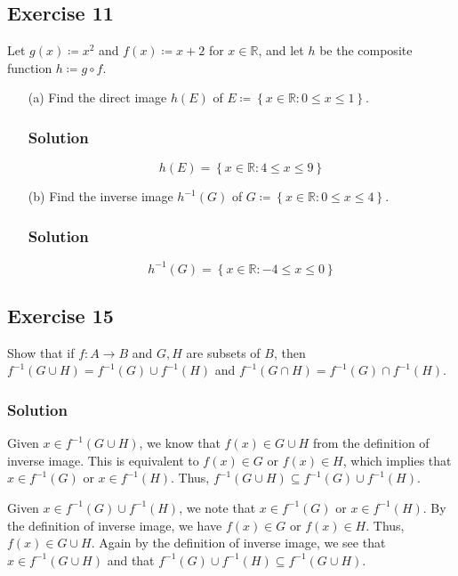 \documentclass[12pt]{article}
\begin{document}
\subsection*{Exercise 11}
Let $g\left(x\right) \coloneqq x^2$  and $f\left(x\right) \coloneqq x + 2$ for $x \in \mathbb{R}$, and let $h$ be the composite function $h \coloneqq g \circ f$.
\begin{itemize}
\item[(a)] Find the direct image $h\left(E\right)$ of $E \coloneqq \left\{x \in \mathbb{R} : 0 \leq x \leq 1\right\}$.
\subsubsection*{Solution}
\[
h\left(E\right) = \left\{x \in \mathbb{R} : 4 \leq x \leq 9\right\}
\]
\item[(b)] Find the inverse image $h^{-1}\left(G\right)$ of $G \coloneqq \left\{x \in \mathbb{R} : 0 \leq x \leq 4\right\}$.
\subsubsection*{Solution}
\[
h^{-1}\left(G\right) = \left\{x \in \mathbb{R} : -4 \leq x \leq 0\right\}
\]
\end{itemize}

\subsection*{Exercise 15}
Show that if $f : A \to B$ and $G, H$ are subsets of $B$, then $f^{-1}\left(G \cup H\right) = f^{-1}\left(G\right) \cup f^{-1}\left(H\right)$ and $f^{-1}\left(G \cap H\right) = f^{-1}\left(G\right) \cap f^{-1}\left(H\right)$.

\subsubsection*{Solution}
Given $x \in f^{-1}\left(G \cup H\right)$, we know that $f\left(x\right) \in G \cup H$ from the definition of inverse image. This is equivalent to $f(x) \in G$ or $f(x) \in H$, which implies that $x \in f^{-1}(G)$ or $x \in f^{-1}(H)$. Thus, $f^{-1}\left(G \cup H\right) \subseteq f^{-1}(G) \cup f^{-1}(H)$.

Given $x \in f^{-1}(G) \cup f^{-1}(H)$, we note that $x \in f^{-1}(G)$ or $x \in f^{-1}(H)$. By the definition of inverse image, we have $f(x) \in G$ or $f(x) \in H$. Thus, $f(x) \in G \cup H$. Again by the definition of inverse image, we see that $x \in f^{-1}\left(G \cup H\right)$ and that $f^{-1}(G) \cup f^{-1}(H) \subseteq f^{-1}\left(G \cup H\right)$.
\end{document}
